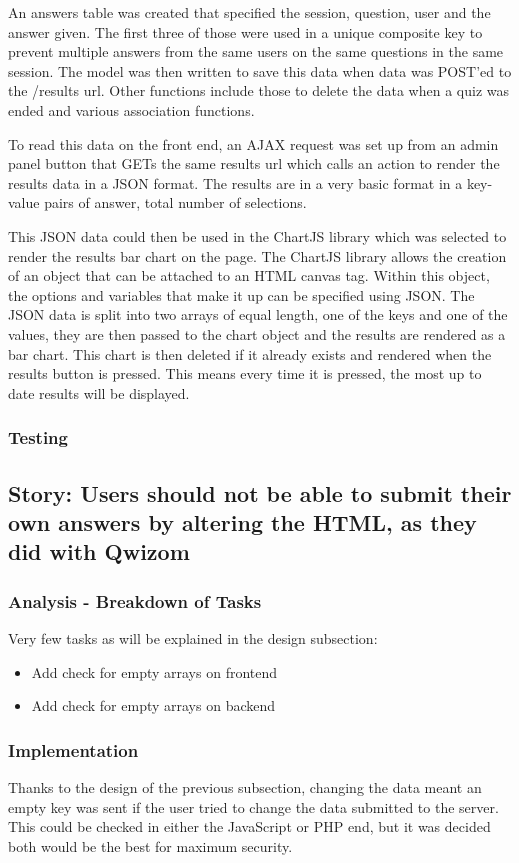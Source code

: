 An answers table was created that specified the session, question, user and the answer given. The first three of those were used in a unique composite key to prevent multiple answers from the same users on the same questions in the same session. The model was then written to save this data when data was POST'ed to the /results url. Other functions include those to delete the data when a quiz was ended and various association functions.

To read this data on the front end, an AJAX request was set up from an admin panel button that GETs the same results url which calls an action to render the results data in a JSON format. The results are in a very basic format in a key-value pairs of answer, total number of selections.

This JSON data could then be used in the ChartJS library which was selected to render the results bar chart on the page\cite{chartjs}. The ChartJS library allows the creation of an object that can be attached to an HTML canvas tag. Within this object, the options and variables that make it up can be specified using JSON. The JSON data is split into two arrays of equal length, one of the keys and one of the values, they are then passed to the chart object and the results are rendered as a bar chart. This chart is then deleted if it already exists and rendered when the results button is pressed. This means every time it is pressed, the most up to date results will be displayed. 
\subsubsection{Testing}
\newpage

\subsection{Story: Users should not be able to submit their own answers by altering the HTML, as they did with Qwizom}
\subsubsection{Analysis - Breakdown of Tasks}
Very few tasks as will be explained in the design subsection:
\begin{itemize}
	\item Add check for empty arrays on frontend
	\item Add check for empty arrays on backend
\end{itemize}
\subsubsection{Implementation}
Thanks to the design of the previous subsection, changing the data meant an empty key was sent if the user tried to change the data submitted to the server. This could be checked in either the JavaScript or PHP end, but it was decided both would be the best for maximum security. 
